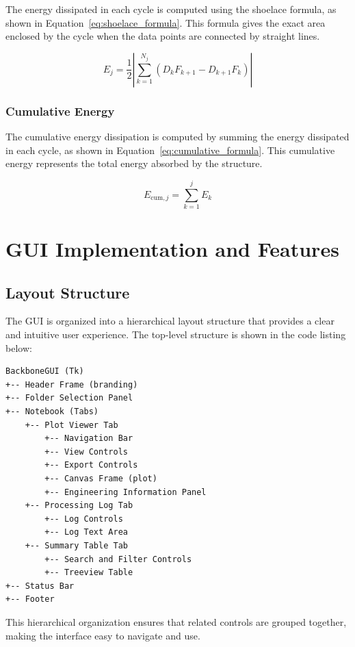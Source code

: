 \documentclass[11pt,a4paper]{article}
\begin{document}
The energy dissipated in each cycle is computed using the shoelace formula, as shown in Equation~\ref{eq:shoelace_formula}. This formula gives the exact area enclosed by the cycle when the data points are connected by straight lines.

\begin{equation}
E_j = \frac{1}{2} \left| \sum_{k=1}^{N_j} (D_k F_{k+1} - D_{k+1} F_k) \right|
\label{eq:shoelace_formula}
\end{equation}

\subsubsection{Cumulative Energy}

The cumulative energy dissipation is computed by summing the energy dissipated in each cycle, as shown in Equation~\ref{eq:cumulative_formula}. This cumulative energy represents the total energy absorbed by the structure.

\begin{equation}
E_{\text{cum},j} = \sum_{k=1}^{j} E_k
\label{eq:cumulative_formula}
\end{equation}

\section{GUI Implementation and Features}

\subsection{Layout Structure}

The GUI is organized into a hierarchical layout structure that provides a clear and intuitive user experience. The top-level structure is shown in the code listing below:

\begin{lstlisting}
BackboneGUI (Tk)
+-- Header Frame (branding)
+-- Folder Selection Panel
+-- Notebook (Tabs)
    +-- Plot Viewer Tab
        +-- Navigation Bar
        +-- View Controls
        +-- Export Controls
        +-- Canvas Frame (plot)
        +-- Engineering Information Panel
    +-- Processing Log Tab
        +-- Log Controls
        +-- Log Text Area
    +-- Summary Table Tab
        +-- Search and Filter Controls
        +-- Treeview Table
+-- Status Bar
+-- Footer
\end{lstlisting}

This hierarchical organization ensures that related controls are grouped together, making the interface easy to navigate and use.
\end{document}
